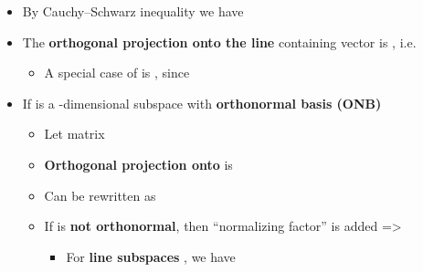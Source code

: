 \hSep %

\begin{itemize}

      \item
            By
            Cauchy--Schwarz inequality we have 
      \item
            The \textbf{orthogonal projection onto the line} containing vector
             is ,
            i.e. 

            \begin{itemize}
                  \item
                        A special case of  is
                        , since
            \end{itemize}
      \item
            If  is a -dimensional
            subspace with \textbf{orthonormal basis (ONB)}

            \begin{itemize}

                  \item
                        Let
                         matrix
                  \item
                        \textbf{Orthogonal projection onto}  is 
                  \item
                        Can be rewritten as
                  \item
                        If  is
                        \textbf{not orthonormal}, then ``normalizing factor''
                         is added =>

                        \begin{itemize}

                              \item
                                    For \textbf{line subspaces} , we
                                    have
                        \end{itemize}
            \end{itemize}
\end{itemize}

